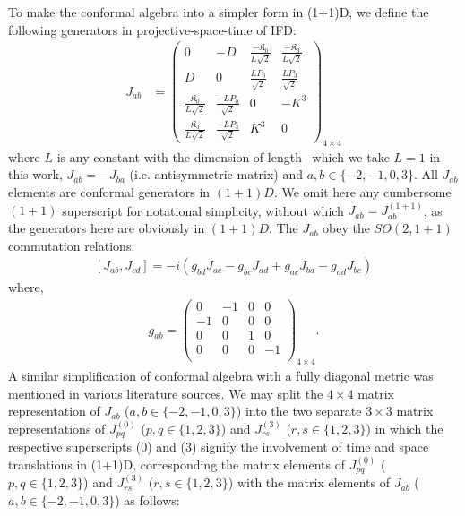 \documentclass[%
 reprint,
superscriptaddress,
 amsmath,amssymb,
 aps,
]{revtex4-2}
\begin{document}
To make the conformal algebra into a simpler form in (1+1)D, we define the following generators in projective-space-time of IFD:
\begin{align}\label{Jab}
  J_{ab}&=
  \begin{pmatrix}
  0&-D&\frac{-\mathfrak{K}_0}{L\sqrt{2}}&\frac{-\mathfrak{K}_3}{L\sqrt{2}}\\
  D&0&\frac{LP_0}{\sqrt{2}}&\frac{LP_3}{\sqrt{2}}\\
    \frac{\mathfrak{K}_0}{L\sqrt{2}}&\frac{-LP_0}{\sqrt{2}}&0  & -K^{3}\\
    \frac{\mathfrak{K}_3}{L\sqrt{2}}&\frac{-LP_3}{\sqrt{2}}&K^{3} & 0
  \end{pmatrix}_{4\times4}
\end{align}
where $L$ is any constant with the dimension of length~\cite{Fubini1976} which we take $L=1$ in this work, $J_{ab}=-J_{ba}$ (i.e. antisymmetric matrix) and $a,b\in\{-2,-1,0,3\}$. All $J_{ab}$ elements are conformal generators in $(1+1)D$. We omit here any cumbersome $(1+1)$ superscript for notational simplicity, without which $J_{ab} = J^{(1+1)}_{ab}$, as the generators here are obviously in $(1+1)D$. The $J_{ab}$ obey the $SO(2,1+1)$ commutation relations:
  \begin{align}\label{JabalgebraIFD}
      \left[J_{{a}{b}},J_{{c}{d}}\right]=-i\left(g_{{b}{d}}J_{{a}{c}}-g_{{b}{c}}J_{{a}{d}}+g_{{a}{c}}J_{{b}{d}}-g_{{a}{d}}J_{{b}{c}}\right)
  \end{align}
where, 
  \begin{align}\label{metric}
      g_{ab}=\begin{pmatrix}
  0&-1&0&0\\
  -1&0&0&0\\
  0&0&1&0\\
  0&0&0&-1\\
  \end{pmatrix}_{4\times4}.
  \end{align}
A similar simplification of conformal algebra with a fully diagonal metric was mentioned in various literature sources\cite {SalamMack1969, Francesco}. We may split the $4\times4$ matrix representation of $J_{ab}$ ($a,b\in\{-2,-1,0,3\}$) into the two separate $3\times3$ matrix representations of $J^{(0)}_{pq}$ ($p,q\in\{1,2,3\}$) and $J^{(3)}_{rs}$ ($r,s\in\{1,2,3\}$) in which the respective superscripts (0) and (3) signify the involvement of time and space translations in (1+1)D, corresponding the matrix elements of $J^{(0)}_{pq}$ ($p,q\in\{1,2,3\}$) and $J^{(3)}_{rs}$ ($r,s\in\{1,2,3\}$) with the matrix elements of $J_{ab}$ ($a,b\in\{-2,-1,0,3\}$) as follows:
\end{document}
